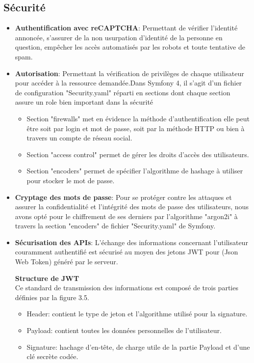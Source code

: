 \subsection{Sécurité}
\begin{itemize}
	\item \textbf{Authentification avec reCAPTCHA}: Permettant de vérifier l'identité annoncée, s'assurer de la non usurpation d'identité de la personne en question, empêcher les accès  automatisés par les robots et   toute tentative de spam.
	\item \textbf{Autorisation}: Permettant la vérification de privilèges de chaque utilisateur pour accéder à la ressource demandée.Dans Symfony 4, il s'agit d'un fichier de configuration  "Security.yaml"  réparti en sections dont chaque section assure un role bien important dans la sécurité 
	\begin{itemize}
		\item Section "firewalls" met en évidence la méthode d'authentification elle peut être soit par login et mot de passe, soit par la méthode HTTP ou bien à travers un compte de réseau social.
		\item Section "access control"  permet de gérer les droits d'accès des utilisateurs.
		\item Section "encoders" permet de spécifier l'algorithme de hashage  à utiliser pour stocker le mot de passe.
	\end{itemize} 
\item \textbf{Cryptage des mots de passe}: 
Pour se protéger contre les attaques et assurer la confidentialité et  l'intégrité des mots de passe des utilisateurs, nous avons opté pour le chiffrement de ses derniers par  l'algorithme "argon2i" à travers la section "encoders" de fichier "Security.yaml" de Symfony.
\item \textbf{Sécurisation des APIs}: L'échange des informations concernant l'utilisateur couramment authentifié est sécurisé au moyen des jetons JWT pour (Json Web Token) généré par le serveur.

 \textbf{Structure de JWT} \\Ce standard de transmission des informations est composé de trois parties définies par la figure 3.5. 



	\begin{itemize}
	\item Header: contient le type de jeton et l'algorithme utilisé pour la signature.
	\item Payload: contient toutes les données personnelles de l'utilisateur.
	\item Signature:  hachage d'en-tête, de charge utile de la partie Payload et d'une clé secrète codée.
	 	

\end{itemize}
\end{itemize}
